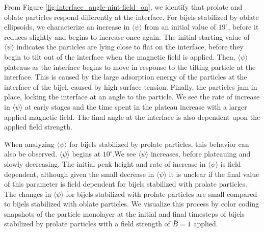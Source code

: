 From Figure \ref{fig:interface_angle-nint-field_on}, we identify that prolate and oblate particles respond differently at the interface. For
bijels stabilized by oblate ellipsoids, we characterize an increase in $\langle \psi \rangle$ from an initial value of \(19 ^{\circ}\),
before it reduces slightly and begins to increase once again. The initial starting value of $\langle \psi \rangle$ indicates the
particles are lying close to flat on the interface, before they begin to tilt out of the interface when the magnetic field is applied. Then,
$\langle \psi \rangle$ plateaus as the interface begins to move in response to the tilting particle at the interface. This is caused by the
large adsorption energy of the particles at the interface of the bijel, caused by high surface tension. Finally, the particles jam in place,
locking the interface at an angle to the particle. We see the rate of increase in $\langle \psi \rangle$ at early stages and the time spent
in the plateau increase with a larger applied magnetic field. The final angle at the interface is also dependent upon the applied field
strength.

When analyzing $\langle \psi \rangle$ for bijels stabilized by prolate particles, this behavior can also be observed. $\langle \psi \rangle$
begins at $10 ^{\circ}$.We see $\langle \psi \rangle$ increases, before plateauing and slowly decreasing. The initial peak height and rate of increase in 
$\langle \psi \rangle$ is field dependent, although given the small decrease in $\langle \psi \rangle$ it is unclear if the final value of this parameter 
is field dependent for bijels stabilized with prolate particles. The changes in $\langle \psi \rangle$ for bijels stabilized with prolate particles are 
small compared to bijels stabilized with oblate particles. We visualize this process by color coding snapshots of the particle monolayer at the initial
and final timesteps of bijels stabilized by prolate particles with a field strength of $\bar{B} = 1$ applied.

